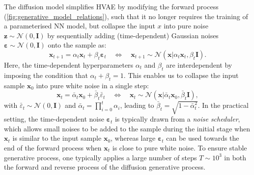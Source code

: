 The diffusion model simplifies HVAE by modifying the forward process (\cref{fig:generative_model_relations}), such that it no longer requires the training of a parameterised NN model, but collapse the input $x$ into  pure noise  $\bm{z}\sim\mathcal{N}(0,\bm{I})$ by sequentially adding (time-dependent) Gaussian noises $\boldsymbol{\varepsilon}\sim\mathcal{N}(0,\bm{I})$ onto the sample as:
\begin{equation}
    \label{eq:diffusion_forward}
    \bm{x}_{t+1}=\alpha_t\bm{x}_{t}+\beta_t\boldsymbol{\varepsilon}_t \quad \Leftrightarrow\quad \bm{x}_{t+1}\sim\mathcal{N}(\bm{x}|\alpha_t\bm{x}_t,\beta_t\bm{I}).
\end{equation}
Here, the time-dependent hyperparameters $\alpha_t$ and $\beta_t$  are interdependent by imposing the condition that $\alpha_t+\beta_t=1$.  This enables us to collapse the input sample $\bm{x}_0$ into pure white noise in a single step:
\begin{equation}
    \label{eq:diffusion_forward_single_step}
    \bm{x}_t=\bar{\alpha}_t\bm{x}_0+\bar{\beta}_t\bar{\varepsilon}_t \quad \Leftrightarrow\quad \bm{x}_{t}\sim\mathcal{N}(\bm{x}|\bar{\alpha}_t\bm{x}_0,\bar{\beta}_t\bm{I}),
\end{equation}
with $\bar{\varepsilon}_t\sim\mathcal{N}(0,\bm{I})$ and $\bar{\alpha}_t=\prod_{i=0}^t\alpha_i$, leading to $\bar{\beta}_t=\sqrt{1-\bar{\alpha}_t^2}$. In the practical setting, the time-dependent noise $\boldsymbol{\varepsilon}_t$ is typically drawn from a \emph{noise scheduler}, which allows small noises to be added to the sample during the initial stage when $\bm{x}_t$ is similar to the input sample $\bm{x}_0$, whereas large $\boldsymbol{\varepsilon}_t$ can be used towards the end of the forward process when $\bm{x}_t$ is close to pure white noise. To ensure stable generative process, one typically applies a large number of steps $T\sim10^3$ in both the forward and reverse process of the diffusion generative process. 

